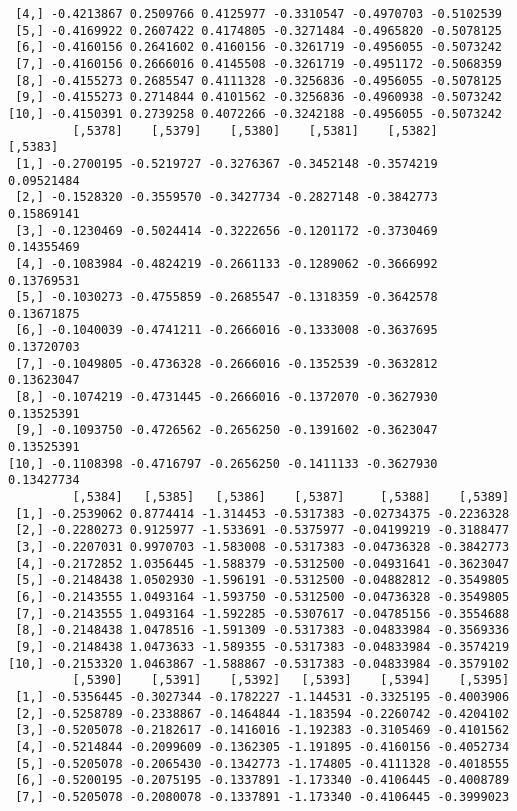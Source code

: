 \documentclass[
  letterpaper,
  DIV=11,
  numbers=noendperiod]{scrreprt}
\begin{document}
\begin{verbatim}
 [4,] -0.4213867 0.2509766 0.4125977 -0.3310547 -0.4970703 -0.5102539
 [5,] -0.4169922 0.2607422 0.4174805 -0.3271484 -0.4965820 -0.5078125
 [6,] -0.4160156 0.2641602 0.4160156 -0.3261719 -0.4956055 -0.5073242
 [7,] -0.4160156 0.2666016 0.4145508 -0.3261719 -0.4951172 -0.5068359
 [8,] -0.4155273 0.2685547 0.4111328 -0.3256836 -0.4956055 -0.5078125
 [9,] -0.4155273 0.2714844 0.4101562 -0.3256836 -0.4960938 -0.5073242
[10,] -0.4150391 0.2739258 0.4072266 -0.3242188 -0.4956055 -0.5073242
         [,5378]    [,5379]    [,5380]    [,5381]    [,5382]    [,5383]
 [1,] -0.2700195 -0.5219727 -0.3276367 -0.3452148 -0.3574219 0.09521484
 [2,] -0.1528320 -0.3559570 -0.3427734 -0.2827148 -0.3842773 0.15869141
 [3,] -0.1230469 -0.5024414 -0.3222656 -0.1201172 -0.3730469 0.14355469
 [4,] -0.1083984 -0.4824219 -0.2661133 -0.1289062 -0.3666992 0.13769531
 [5,] -0.1030273 -0.4755859 -0.2685547 -0.1318359 -0.3642578 0.13671875
 [6,] -0.1040039 -0.4741211 -0.2666016 -0.1333008 -0.3637695 0.13720703
 [7,] -0.1049805 -0.4736328 -0.2666016 -0.1352539 -0.3632812 0.13623047
 [8,] -0.1074219 -0.4731445 -0.2666016 -0.1372070 -0.3627930 0.13525391
 [9,] -0.1093750 -0.4726562 -0.2656250 -0.1391602 -0.3623047 0.13525391
[10,] -0.1108398 -0.4716797 -0.2656250 -0.1411133 -0.3627930 0.13427734
         [,5384]   [,5385]   [,5386]    [,5387]     [,5388]    [,5389]
 [1,] -0.2539062 0.8774414 -1.314453 -0.5317383 -0.02734375 -0.2236328
 [2,] -0.2280273 0.9125977 -1.533691 -0.5375977 -0.04199219 -0.3188477
 [3,] -0.2207031 0.9970703 -1.583008 -0.5317383 -0.04736328 -0.3842773
 [4,] -0.2172852 1.0356445 -1.588379 -0.5312500 -0.04931641 -0.3623047
 [5,] -0.2148438 1.0502930 -1.596191 -0.5312500 -0.04882812 -0.3549805
 [6,] -0.2143555 1.0493164 -1.593750 -0.5312500 -0.04736328 -0.3549805
 [7,] -0.2143555 1.0493164 -1.592285 -0.5307617 -0.04785156 -0.3554688
 [8,] -0.2148438 1.0478516 -1.591309 -0.5317383 -0.04833984 -0.3569336
 [9,] -0.2148438 1.0473633 -1.589355 -0.5317383 -0.04833984 -0.3574219
[10,] -0.2153320 1.0463867 -1.588867 -0.5317383 -0.04833984 -0.3579102
         [,5390]    [,5391]    [,5392]   [,5393]    [,5394]    [,5395]
 [1,] -0.5356445 -0.3027344 -0.1782227 -1.144531 -0.3325195 -0.4003906
 [2,] -0.5258789 -0.2338867 -0.1464844 -1.183594 -0.2260742 -0.4204102
 [3,] -0.5205078 -0.2182617 -0.1416016 -1.192383 -0.3105469 -0.4101562
 [4,] -0.5214844 -0.2099609 -0.1362305 -1.191895 -0.4160156 -0.4052734
 [5,] -0.5205078 -0.2065430 -0.1342773 -1.174805 -0.4111328 -0.4018555
 [6,] -0.5200195 -0.2075195 -0.1337891 -1.173340 -0.4106445 -0.4008789
 [7,] -0.5205078 -0.2080078 -0.1337891 -1.173340 -0.4106445 -0.3999023

\end{verbatim}
\end{document}

